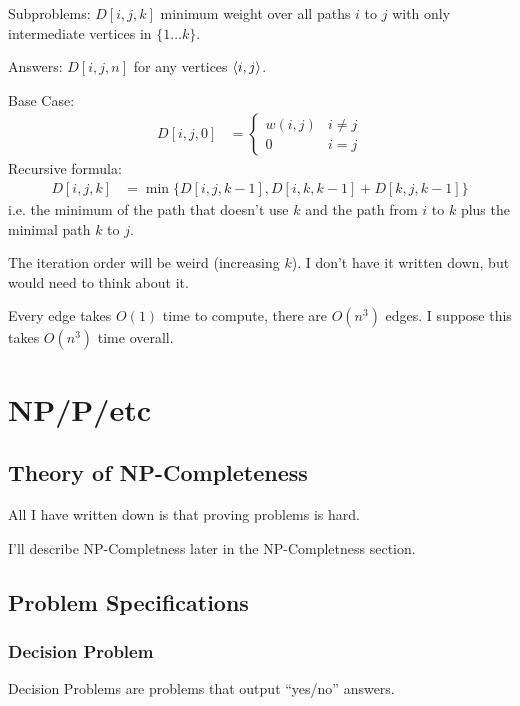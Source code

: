                 Subproblems: $D[i, j, k]$ minimum weight over all paths $i$ to
                $j$ with only intermediate vertices in $\{ 1 \ldots k \}$.

                Answers: $D[i, j, n]$ for any vertices $\left \langle i, j \right \rangle $.

                Base Case:
                \begin{align*}
                    D[i, j, 0] &=
                        \left\{
                            \begin{array}{lr}
                                w(i, j) & i \ne j \\
                                0 & i = j
                            \end{array}
                        \right.
                \end{align*}
                Recursive formula:
                \begin{align*}
                    D[i, j, k] &= \min \{ D[i, j, k-1], D[i, k, k-1] + D[k, j, k-1] \}
                \end{align*}
                i.e. the minimum of the path that doesn't use $k$ and the path
                from $i$ to $k$ plus the minimal path $k$ to $j$.

                The iteration order will be weird (increasing $k$). I don't have
                it written down, but would need to think about it.

                Every edge takes $O(1)$ time to compute, there are $O(n^3)$
                edges. I suppose this takes $O(n^3)$ time overall.

\chapter{NP/P/etc}
    \section{Theory of NP-Completeness}
        All I have written down is that proving problems is hard.

        I'll describe NP-Completness later in the NP-Completness section.
    \section{Problem Specifications}
        \subsection{Decision Problem}
            Decision Problems are problems that output ``yes/no'' answers.
